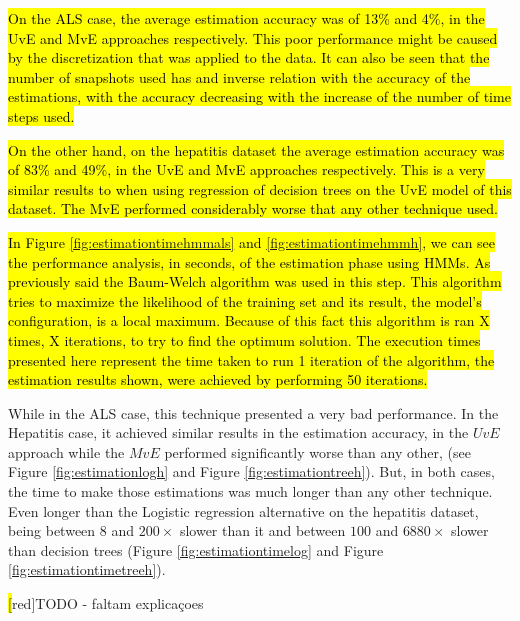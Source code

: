 \hl{On the ALS case, the average estimation accuracy was of 13\% and 4\%, in the UvE and MvE approaches respectively. This poor performance might be caused by the discretization that was applied to the data. It can also be seen that the number of snapshots used has and inverse relation with the accuracy of the estimations, with the accuracy decreasing with the increase of the number of time steps used.}

\hl{On the other hand, on the hepatitis dataset the average estimation accuracy was of 83\% and 49\%, in the UvE and MvE approaches respectively. This is a very similar results to when using regression of decision trees on the UvE model of this dataset. The MvE performed considerably worse that any other technique used.}

\hl{In Figure \ref{fig:estimationtimehmmals} and \ref{fig:estimationtimehmmh}, we can see the performance analysis, in seconds, of the estimation phase using HMMs. As previously said the Baum-Welch algorithm was used in this step. This algorithm tries to maximize the likelihood of the training set and its result, the model's configuration, is a local maximum. Because of this fact this algorithm is ran X times, X iterations, to try to find the optimum solution. The execution times presented here represent the time taken to run 1 iteration of the algorithm, the estimation results shown, were achieved by performing 50 iterations.}

While in the ALS case, this technique presented a very bad performance. In the Hepatitis case, it achieved similar results in the estimation accuracy, in the $UvE$ approach while the $MvE$ performed significantly worse than any other, (see Figure \ref{fig:estimationlogh} and Figure \ref{fig:estimationtreeh}).
But, in both cases, the time to make those estimations was much longer than any other technique. Even longer than the Logistic regression alternative on the hepatitis dataset, being between $8$ and $200\times$ slower than it and between $100$ and $6880\times$ slower than decision trees (Figure \ref{fig:estimationtimelog} and Figure \ref{fig:estimationtimetreeh}).
 
\hl[red]{TODO - faltam explicaçoes}
 
